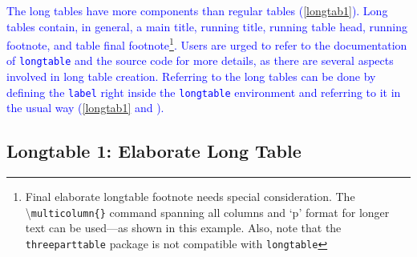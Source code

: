 \documentclass[phd,showframe]{ndsu-thesis-2022}
\newcommand\italk[1]{\textcolor{blue}{#1}}  %
\newcommand\cmd[1]{\textbackslash\texttt{#1}}  %
\newcommand\vb[1]{\textcolor{blue}{\texttt{#1}}}%
\begin{document}
\italk{The long tables have more components than regular tables (\cref{longtab1}). Long tables contain, in general, a main title, running title, running table head, running footnote, and table final footnote\footnote{Final elaborate longtable footnote needs special consideration. The \cmd{multicolumn\{\}} command spanning all columns and `p' format for longer text can be used---as shown in this example. Also, note that the \texttt{threeparttable} package is not compatible with \texttt{longtable}}. Users are urged to refer to the documentation of \vb{longtable} and the source code for more details, as there are several aspects involved in long table creation. Referring to the long tables can be done by defining the \texttt{label} right inside the \texttt{longtable} environment and referring to it in the usual way (\cref{longtab1} and \Cref{longtab1}).}


\subsection{Longtable 1: Elaborate Long Table}


\begingroup%

\newcommand{\heads}{%
\toprule
Area (ha) & Number  & Methods & Aggregation & Transport & Total & MD$^\dag$ & TSP$^\ddag$ \\
$[$ac$]$ & of bales  &  & (km) & (km) & (km) & (km) & (km) \\
\midrule
}
\end{document}
